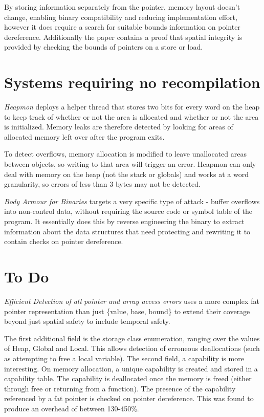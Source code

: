 By storing information separately from the pointer, memory layout doesn't change, enabling binary compatibility and reducing implementation effort, however it does require a search for suitable bounds information on pointer dereference.
Additionally the paper contains a proof that spatial integrity is provided by checking the bounds of pointers on a store or load.

\section{Systems requiring no recompilation}


\textit{Heapmon} \cite{shetty2005heapmon} deploys a helper thread that stores two bits for every word on the heap to keep track of whether or not the area is allocated and whether or not the area is initialized.
Memory leaks are therefore detected by looking for areas of allocated memory left over after the program exits.

To detect overflows, memory allocation is modified to leave unallocated areas between objects, so writing to that area will trigger an error.
Heapmon can only deal with memory on the heap (not the stack or globals) and works at a word granularity, so errors of less than 3 bytes may not be detected.

\textit{Body Armour for Binaries} \cite{slowinska2012body} targets a very specific type of attack - buffer overflows into non-control data, without requiring the source code or symbol table of the program.
It essentially does this by reverse engineering the binary to extract information about the data structures that need protecting and rewriting it to contain checks on pointer dereference.


\section{To Do}

\textit{Efficient Detection of all pointer and array access errors} \cite{austin1994efficient} uses a more complex fat pointer representation than just \{value, base, bound\} to extend their coverage beyond just spatial safety to include temporal safety.

The first additional field is the storage class enumeration, ranging over the values of Heap, Global and Local.
This allows detection of erroneous deallocations (such as attempting to free a local variable).
The second field, a capability is more interesting.
On memory allocation, a unique capability is created and stored in a capability table.
The capability is deallocated once the memory is freed (either through free or returning from a function).
The presence of the capability referenced by a fat pointer is checked on pointer dereference.
This was found to produce an overhead of between 130-450\%.


